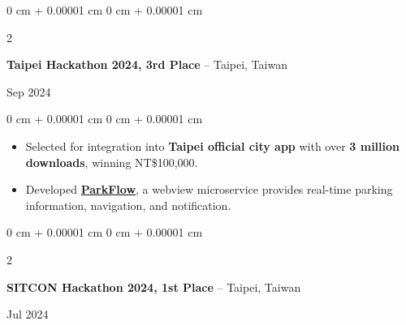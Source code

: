 \documentclass[10pt, letterpaper]{article}
\newenvironment{highlights}{
    \begin{itemize}[
        topsep=0.10 cm,
        parsep=0.10 cm,
        partopsep=0pt,
        itemsep=0pt,
        leftmargin=0 cm + 10pt
    ]
}{
    \end{itemize}
} %
\newenvironment{onecolentry}{
    \begin{adjustwidth}{
        0 cm + 0.00001 cm
    }{
        0 cm + 0.00001 cm
    }
}{
    \end{adjustwidth}
} %
\newenvironment{twocolentry}[2][]{
    \onecolentry
    \def\secondColumn{#2}
    \setcolumnwidth{\fill, 5.2 cm}
    \begin{paracol}{2}
}{
    \switchcolumn \raggedleft \secondColumn
    \end{paracol}
    \endonecolentry
} %
\begin{document}
    
    \vspace{0.1 cm}
    
    \begin{twocolentry}{
        Sep 2024
    }
        \textbf{Taipei Hackathon 2024, 3rd Place} -- Taipei, Taiwan
    \end{twocolentry}
    
    \vspace{0.10 cm}
    \begin{onecolentry}
        \begin{highlights}
            \item Selected for integration into \textbf{Taipei official city app} with over \textbf{3 million downloads}, winning NT\$100,000.
            \item Developed \textbf{\href{https://github.com/vaclisinc/ParkFlow}{ParkFlow}}, a webview microservice provides real-time parking information, navigation, and notification.
        \end{highlights}
    \end{onecolentry}
    
    \vspace{0.1 cm}
    
     \begin{twocolentry}{
         Jul 2024
     }
         \textbf{SITCON Hackathon 2024, 1st Place} -- Taipei, Taiwan
     \end{twocolentry}
    
\end{document}
